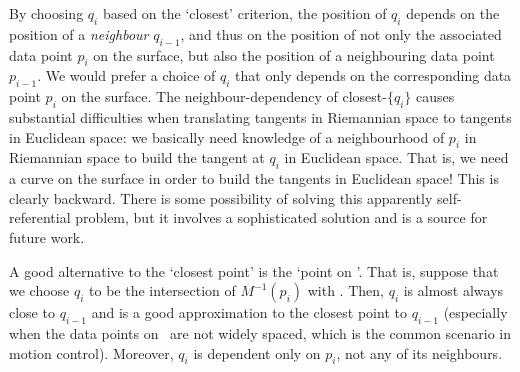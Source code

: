 By choosing $q_i$ based on the `closest' criterion,
the position of $q_i$ depends on the position of a {\em neighbour} $q_{i-1}$,
and thus on the position of not only the associated data point $p_i$ on the
surface, but also the position of a neighbouring data point $p_{i-1}$.
We would prefer a choice of $q_i$ that only depends on the corresponding
data point $p_i$ on the surface.
The neighbour-dependency of closest-$\{q_i\}$
causes substantial difficulties when translating tangents in Riemannian space
to tangents in Euclidean space: 
we basically need knowledge of a neighbourhood of $p_i$ in Riemannian space
to build the tangent at $q_i$ in Euclidean space.
That is, we need a curve on the surface in order to build the tangents
in Euclidean space!
This is clearly backward.
There is some possibility of solving this apparently self-referential problem,
but it involves a sophisticated solution and is a source for future work.
%
%
%


A good alternative to the `closest point' is the `point on '.
That is, suppose that we choose $q_i$ to be the intersection of
$M^{-1}(p_i)$ with .
Then, $q_i$ is almost always close to $q_{i-1}$
and is a good approximation to the closest point to $q_{i-1}$
(especially when the data points on \ are not widely spaced, which
is the common scenario in motion control).
Moreover, $q_i$ is dependent only on $p_i$, not any of its neighbours.

